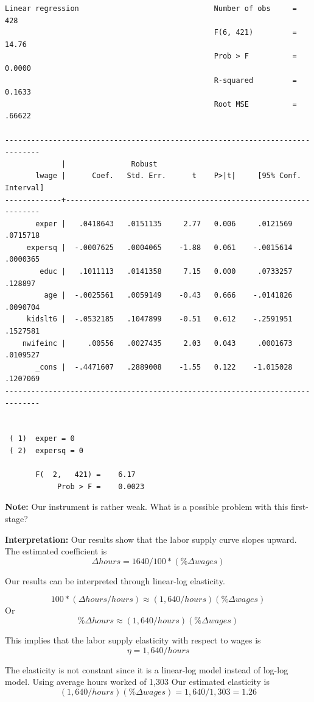 \documentclass[
]{book}
\begin{document}
\begin{verbatim}
Linear regression                               Number of obs     =        428
                                                F(6, 421)         =      14.76
                                                Prob > F          =     0.0000
                                                R-squared         =     0.1633
                                                Root MSE          =     .66622

------------------------------------------------------------------------------
             |               Robust
       lwage |      Coef.   Std. Err.      t    P>|t|     [95% Conf. Interval]
-------------+----------------------------------------------------------------
       exper |   .0418643   .0151135     2.77   0.006     .0121569    .0715718
     expersq |  -.0007625   .0004065    -1.88   0.061    -.0015614    .0000365
        educ |   .1011113   .0141358     7.15   0.000     .0733257     .128897
         age |  -.0025561   .0059149    -0.43   0.666    -.0141826    .0090704
     kidslt6 |  -.0532185   .1047899    -0.51   0.612    -.2591951    .1527581
    nwifeinc |     .00556   .0027435     2.03   0.043     .0001673    .0109527
       _cons |  -.4471607   .2889008    -1.55   0.122    -1.015028    .1207069
------------------------------------------------------------------------------


 ( 1)  exper = 0
 ( 2)  expersq = 0

       F(  2,   421) =    6.17
            Prob > F =    0.0023
\end{verbatim}

\textbf{Note:} Our instrument is rather weak. What is a possible problem with this first-stage?

\textbf{Interpretation:}
Our results show that the labor supply curve slopes upward. The estimated coefficient is
\[ \Delta hours = 1640/100 * (\% \Delta wages) \]

Our results can be interpreted through linear-log elasticity.

\[ 100*(\Delta hours/hours) \approx (1,640/hours)(\% \Delta wages) \]
Or
\[ \% \Delta hours \approx (1,640/hours)(\% \Delta wages) \]

This implies that the labor supply elasticity with respect to wages is \[ \eta =  1,640/hours \]

The elasticity is not constant since it is a linear-log model instead of log-log model.
Using average hours worked of 1,303
Our estimated elasticity is \[ (1,640/hours)(\%\Delta wages) = 1,640/1,303=1.26 \]
\end{document}
